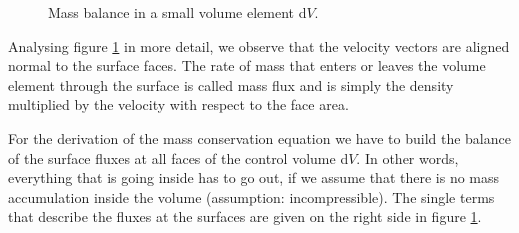 \begin{figure}[!b]
\caption{Mass balance in a small volume element d$V$.}
\label{figure::massFigure}
\end{figure}
%
%
%
%

	Analysing figure \ref{figure::massFigure} in more detail, we observe that
    the velocity vectors are aligned normal to the surface faces. The rate of
    mass that enters or leaves the volume element through the surface is called
    mass flux and is simply the density multiplied by the velocity with respect
    to the face area.

	For the derivation of the mass conservation equation we have to build the
    balance of the surface fluxes at all faces of the control volume d$V$.
    In other words, everything that is going inside has to go out, if we
    assume that there is no mass accumulation inside the volume
    (assumption: incompressible). The single terms that describe the fluxes
    at the surfaces are given on the right side in figure \ref{figure::massFigure}.

